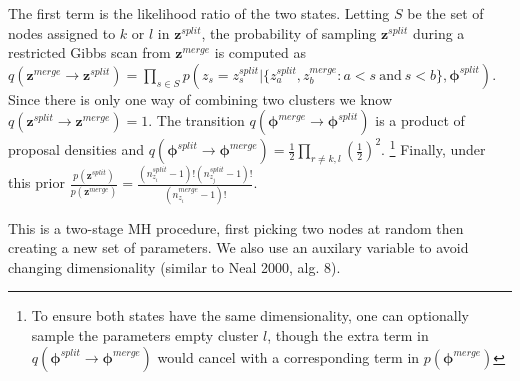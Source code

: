 \documentclass{article}
\begin{document}
The first term is the likelihood ratio of the two states.  Letting $S$ be the set of nodes assigned to $k$ or $l$ in $\mathbf{z}^{split}$, the probability of sampling $\mathbf{z}^{split}$ during a restricted Gibbs scan from  $\mathbf{z}^{merge}$ is computed as $q( \mathbf{z}^{merge} \rightarrow \mathbf{z}^{split}) = \prod_{s \in S} p(z_{s}=z_s^{split} |\{ z_a^{split},z_{b}^{merge}: a  < s \ \mbox{and} \ s < b\}, \boldsymbol{\phi}^{split})$.  Since there is only one way of combining two clusters we know $q(\mathbf{z}^{split} \rightarrow \mathbf{z}^{merge})=1$.   The transition $q(\boldsymbol{\phi}^{merge} \rightarrow \boldsymbol{\phi}^{split})$ is a product of proposal densities and
$q(\boldsymbol{\phi}^{split} \rightarrow
\boldsymbol{\phi}^{merge}) = \frac{1}{2}\prod_{r \ne k,l}\left(\frac{1}{2}\right)^2$. \footnote{To ensure both states have the same dimensionality, one can optionally sample the parameters empty cluster $l$, though the extra term  in $q(\boldsymbol{\phi}^{split} \rightarrow \boldsymbol{\phi}^{merge})$ would cancel with a corresponding term in $p(\boldsymbol{\phi}^{merge})$}  Finally, under this prior $ \frac{p(\mathbf{z}^{split})}{p(\mathbf{z}^{merge})} = \frac{(n_{z_i}^{split} - 1)!(n_{z_j}^{split} - 1)!}{(n_{z_i}^{merge}-1)!}$.   


This is a two-stage MH procedure, first picking two nodes at random then creating a new set of parameters.  We also use an auxilary variable to avoid changing dimensionality (similar to Neal 2000, alg. 8).

\end{document}

